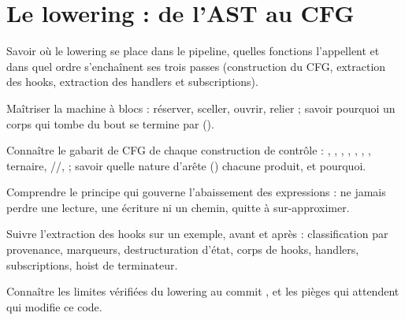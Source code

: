 \chapter{Le lowering : de l'AST au CFG}
\label{chap:lowering-cfg}

\begin{objectifs}
  \item Savoir où le lowering se place dans le pipeline, quelles fonctions l'appellent et dans quel ordre s'enchaînent ses trois passes (construction du CFG, extraction des hooks, extraction des handlers et subscriptions).
  \item Maîtriser la machine à blocs  : réserver, sceller, ouvrir, relier ; savoir pourquoi un corps qui \og tombe du bout\fg{} se termine par  ().
  \item Connaître le gabarit de CFG de chaque construction de contrôle : , , , , , , , ternaire, \code{&&}/\code{||}/,  ; savoir quelle nature d'arête () chacune produit, et pourquoi.
  \item Comprendre le principe qui gouverne l'abaissement des expressions : ne jamais perdre une lecture, une écriture ni un chemin, quitte à sur-approximer.
  \item Suivre l'extraction des hooks sur un exemple, avant et après : classification par provenance, marqueurs, destructuration d'état, corps de hooks, handlers, subscriptions, hoist de terminateur.
  \item Connaître les limites vérifiées du lowering au commit \snapshotCommit{}, et les pièges qui attendent qui modifie ce code.
\end{objectifs}

